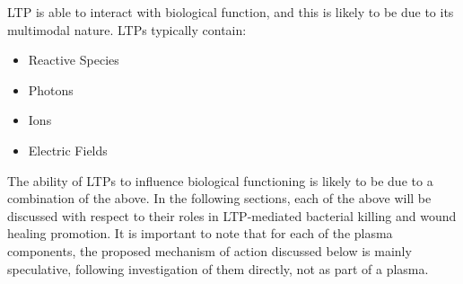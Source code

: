 \documentclass[11pt, oneside]{article}   	%
\begin{document}
LTP is able to interact with biological function, and this is likely to be due to its multimodal nature.
LTPs typically contain:
\begin{itemize}
\item Reactive Species
\item Photons
\item Ions
\item Electric Fields
\end{itemize}
The ability of LTPs to influence biological functioning is likely to be due to a combination of the above.
In the following sections, each of the above will be discussed with respect to their roles in LTP-mediated bacterial killing and wound healing promotion.
It is important to note that for each of the plasma components, the proposed mechanism of action discussed below is mainly speculative, following investigation of them directly, not as part of a plasma.


%
%
%
\end{document}

